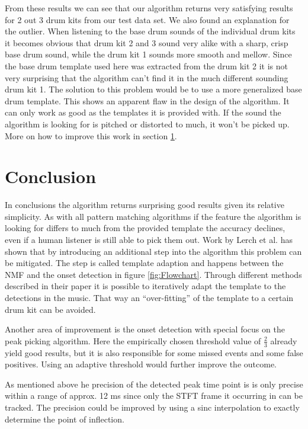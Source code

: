 \documentclass{article}
\begin{document}
From these results we can see that our algorithm returns very satisfying results for 2 out 3 drum kits from our test data set.
We also found an explanation for the outlier.
When listening to the base drum sounds of the individual drum kits it becomes obvious that drum kit 2 and 3 sound very alike with a sharp, crisp base drum sound, while the drum kit 1 sounds more smooth and mellow.
Since the base drum template used here was extracted from the drum kit 2 it is not very surprising that the algorithm can't find it in the much different sounding drum kit 1.
The solution to this problem would be to use a more generalized base drum template.
This shows an apparent flaw in the design of the algorithm.
It can only work as good as the templates it is provided with.
If the sound the algorithm is looking for is pitched or distorted to much, it won't be picked up.
More on how to improve this work in section \ref{sec:conclusion}.






\section{Conclusion}
\label{sec:conclusion}

In conclusions the algorithm returns surprising good results given its relative simplicity.
As with all pattern matching algorithms if the feature the algorithm is looking for differs to much from the provided template the accuracy declines, even if a human listener is still able to pick them out.
Work by Lerch et al. \cite{lerch2015} has shown that by introducing an additional step into the algorithm this problem can be mitigated.
The step is called template adaption and happens between the NMF and the onset detection in figure \ref{fig:Flowchart}.
Through different methods described in their paper it is possible to iteratively adapt the template to the detections in the music.
That way an ``over-fitting'' of the template to a certain drum kit can be avoided.

Another area of improvement is the onset detection with special focus on the peak picking algorithm.
Here the empirically chosen threshold value of $\frac{2}{3}$ already yield good results, but it is also responsible for some missed events and some false positives.
Using an adaptive threshold would further improve the outcome.

As mentioned above he precision of the detected peak time point is is only precise within a range of approx. 12 ms since only the STFT frame it occurring in can be tracked.
The precision could be improved by using a sinc interpolation to exactly determine the point of inflection.
\end{document}
